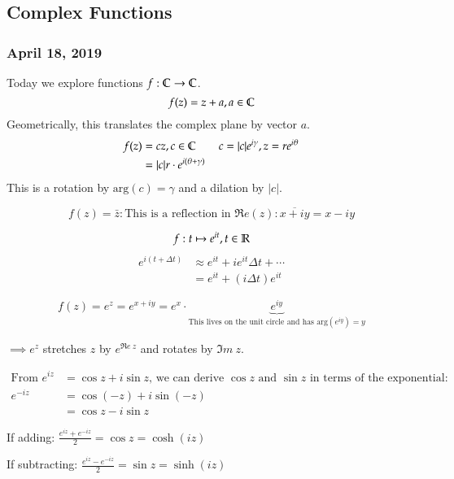 \subsection{Complex Functions}
\subsubsection*{April 18, 2019}

Today we explore functions $f : \mathbb{C} \to \mathbb{C}$. 
\[f(z)=z+a, a\in\mathbb{C}\]
Geometrically, this translates the complex plane by vector $a$. 
\begin{align*}
	f(z)&=cz, c\in\mathbb{C}\qquad c=|c|e^{i\gamma}, z=r e^{i\theta} \\
	&=|c| r \cdot e^{i(\theta+\gamma)}
\end{align*}
This is a rotation by $\mathrm{arg}(c)=\gamma$ and a dilation by $|c|$. 

\[f(z)=\bar{z} : \text{This is a reflection in } \Re e (z) : \overline{x+iy}=x-iy\]

\[f : t\mapsto e^{it}, t\in \mathbb{R}\]
\begin{align*}
	e^{i(t+\Delta t)}&\approx e^{it}+ ie^{it}\Delta t + \cdots \\
	&= e^{it}+(i\Delta t)e^{it}
\end{align*}

\[f(z)=e^z=e^{x+iy}=e^x\cdot \underbrace{e^{iy}}_{\text{This lives on the unit circle and has } \mathrm{arg}(e^{iy})=y}\]

$\implies e^z$ stretches $z$ by $e^{\Re e\ z}$ and rotates by $\Im m\ z$. 

\begin{align*}
	\text{From } e^{iz} &= \cos z + i \sin z \text{, we can derive $\cos z$ and $\sin z$ in terms of the exponential:} \\
	e^{-iz} &= \cos(-z) + i\sin (-z) \\
	&= \cos z - i \sin z
\end{align*}

If adding: $\displaystyle \frac{e^{iz}+e^{-iz}}{2}=\cos z = \cosh (iz)$

If subtracting: $\displaystyle \frac{e^{iz}-e^{-iz}}{2}=\sin z = \sinh (iz)$